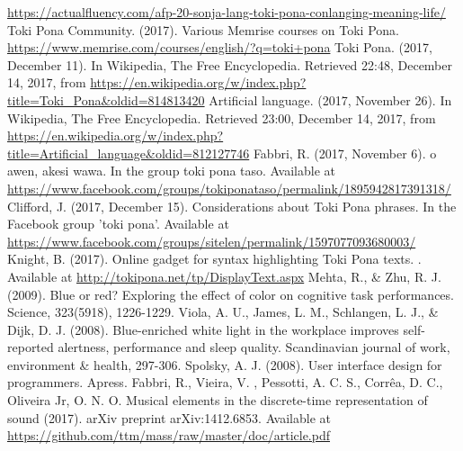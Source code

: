 \documentclass{article}
\begin{document}
\begin{thebibliography}{99}
    \url{https://actualfluency.com/afp-20-sonja-lang-toki-pona-conlanging-meaning-life/}
  Toki Pona Community. (2017). Various Memrise courses on Toki Pona.
    \url{https://www.memrise.com/courses/english/?q=toki+pona}
  Toki Pona. (2017, December 11). In Wikipedia, The Free Encyclopedia.
    Retrieved 22:48, December 14, 2017, from
    \url{https://en.wikipedia.org/w/index.php?title=Toki_Pona&oldid=814813420}
  Artificial language. (2017, November 26). In Wikipedia, The Free
  Encyclopedia. Retrieved 23:00, December 14, 2017, from
  \url{https://en.wikipedia.org/w/index.php?title=Artificial_language&oldid=812127746}
  Fabbri, R. (2017, November 6). o awen, akesi wawa.
  In the group toki pona taso. Available at
  \url{https://www.facebook.com/groups/tokiponataso/permalink/1895942817391318/}
  Clifford, J. (2017, December 15). Considerations about Toki Pona
  phrases.
  In the Facebook group 'toki pona'. Available at
  \url{https://www.facebook.com/groups/sitelen/permalink/1597077093680003/}
  Knight, B. (2017). Online gadget for syntax highlighting Toki Pona
  texts. . Available at
  \url{http://tokipona.net/tp/DisplayText.aspx}
  Mehta, R., \& Zhu, R. J. (2009). Blue or red? Exploring the effect of
  color on cognitive task performances. Science, 323(5918), 1226-1229.
  Viola, A. U., James, L. M., Schlangen, L. J., \& Dijk, D. J. (2008).
  Blue-enriched white light in the workplace improves self-reported
  alertness, performance and sleep quality. Scandinavian journal of
  work, environment \& health, 297-306.
  Spolsky, A. J. (2008). User interface design for programmers.
  Apress.
	Fabbri, R., Vieira, V. , Pessotti, A. C. S., Corrêa, D. C., Oliveira Jr, O. N. O. Musical elements in the discrete-time representation of sound (2017). arXiv preprint arXiv:1412.6853. Available at \url{https://github.com/ttm/mass/raw/master/doc/article.pdf}
\end{thebibliography}
\end{document}
